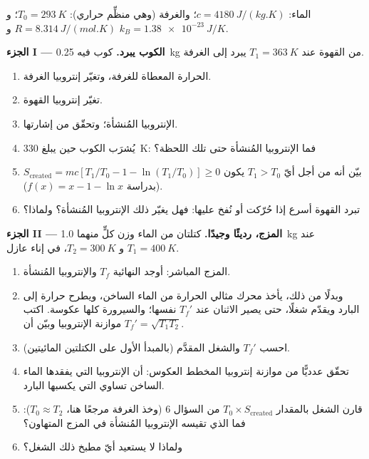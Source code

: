 \begin{problem}
\label{pb:b1:second-law-entropy:1}
الماء: $c = \qty{4180}{J/(kg.K)}$؛ والغرفة (وهي منظِّم حراري): $T_0 = \qty{293}{K}$؛
و $R = \qty{8.314}{J/(mol.K)}$ و $k_B = \qty{1.38e-23}{J/K}$.

\medskip
\noindent\textbf{الجزء I --- الكوب يبرد.}
كوب فيه \qty{0.25}{kg} من القهوة عند $T_1 = \qty{363}{K}$ يبرد إلى  الغرفة.
\begin{enumerate}
  \item الحرارة المعطاة للغرفة، وتغيّر إنتروبيا الغرفة.
  \item تغيّر إنتروبيا القهوة.
  \item الإنتروبيا المُنشأة؛ وتحقّق من إشارتها.
  \item يُشرَب الكوب حين يبلغ \qty{330}{K}: فما الإنتروبيا المُنشأة حتى
        تلك اللحظة؟
  \item بيّن أنه من أجل أيّ $T_1 > T_0$ يكون $S_{\mathrm{created}} = mc[T_1/T_0 - 1 -
        \ln(T_1/T_0)] \geq 0$ (بدراسة $f(x) = x - 1 - \ln x$).
  \item تبرد القهوة أسرع إذا حُرّكت أو نُفخ عليها: فهل يغيّر ذلك
        الإنتروبيا المُنشأة؟ ولماذا؟
\end{enumerate}

\medskip
\noindent\textbf{الجزء II --- المزج، رديئًا وجيدًا.}
كتلتان من الماء وزن كلٍّ منهما \qty{1.0}{kg} عند $T_1 = \qty{400}{K}$ و $T_2 =
\qty{300}{K}$، في إناء عازل.
\begin{enumerate}[resume]
  \item المزج المباشر: أوجد  النهائية $T_f$ والإنتروبيا المُنشأة.
  \item وبدلًا من ذلك، يأخذ محرك مثالي الحرارة من الماء الساخن، ويطرح
        حرارة إلى البارد ويقدّم شغلًا، حتى يصير الاثنان عند  $T_f'$ نفسها؛ والسيرورة كلها عكوسة. اكتب موازنة
        الإنتروبيا وبيّن أن $T_f' = \sqrt{T_1T_2}$.
  \item احسب $T_f'$ والشغل المقدَّم (بالمبدأ الأول على الكتلتين
        المائيتين).
  \item تحقّق عدديًّا من موازنة إنتروبيا المخطط العكوس: أن الإنتروبيا
        التي يفقدها الماء الساخن تساوي التي يكسبها البارد.
  \item قارن الشغل بالمقدار $T_0 \times S_{\mathrm{created}}$ من السؤال 6
        (وخذ الغرفة مرجعًا  هنا، $T_0 \approx T_2$):
        فما الذي تقيسه الإنتروبيا المُنشأة في المزج المتهاون؟
  \item ولماذا لا يستعيد أيّ مطبخ ذلك الشغل؟
\end{enumerate}


\end{problem}
